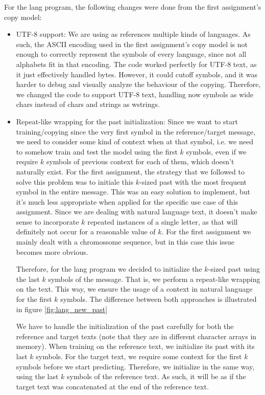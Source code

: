 \documentclass{article}
\begin{document}
For the lang program, the following changes were done from the first assignment's copy model:
\begin{itemize}
    \item UTF-8 support:
    We are using as references multiple kinds of languages.
    As such, the ASCII encoding used in the first assignment's copy model is not enough to correctly represent the symbols of every language, since not all alphabets fit in that encoding.
    The code worked perfectly for UTF-8 text, as it just effectively handled bytes.
    However, it could cutoff symbols, and it was harder to debug and visually analyze the behaviour of the copying.
    Therefore, we changed the code to support UTF-8 text, handling now symbols as wide chars instead of chars and strings as wstrings.
    
    \item Repeat-like wrapping for the past initialization:
    Since we want to start training/copying since the very first symbol in the reference/target message, we need to consider some kind of context when at that symbol, i.e. we need to somehow train and test the model using the first $k$ symbols, even if we require $k$ symbols of previous context for each of them, which doesn't naturally exist.
    For the first assignment, the strategy that we followed to solve this problem was to initiale this $k$-sized past with the most frequent symbol in the entire message.
    This was an easy solution to implement, but it's much less appropriate when applied for the specific use case of this assignment.
    Since we are dealing with natural language text, it doesn't make sense to incorporate $k$ repeated instances of a single letter, as that will definitely not occur for a reasonable value of $k$.
    For the first assignment we mainly dealt with a chromossome sequence, but in this case this issue becomes more obvious.

    Therefore, for the lang program we decided to initialize the $k$-sized past using the last $k$ symbols of the message.
    That is, we perform a repeat-like wrapping on the text.
    This way, we ensure the usage of a context in natural language for the first $k$ symbols.
    The difference between both approaches is illustrated in figure \ref{fig:lang_new_past}

    We have to handle the initialization of the past carefully for both the reference and target texts (note that they are in different character arrays in memory).
    When training on the reference text, we initialize its past with its last $k$ symbols.
    For the target text, we require some context for the first $k$ symbols before we start predicting.
    Therefore, we initialize in the same way, using the last $k$ symbols of the reference text.
    As such, it will be as if the target text was concatenated at the end of the reference text.
    

\end{itemize}
\end{document}
